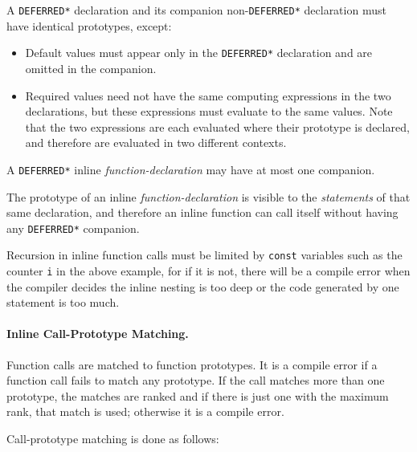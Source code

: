 \documentclass[12pt]{article}
\newcommand{\subsubsubsection}[1]{\paragraph[#1]{#1.}}
\begin{document}
A {\tt *DEFERRED*} declaration and its companion non-{\tt *DEFERRED*}
declaration must have identical prototypes, except:
\label{COMPANION-DECLARATION}
\begin{itemize}
\item Default values must appear only in the {\tt *DEFERRED*} declaration
and are omitted in the companion.
\item Required values need not have the same computing expressions
in the two declarations, but these expressions must evaluate to the
same values.  Note that the two expressions are each evaluated where
their prototype is declared, and therefore are evaluated in
two different contexts.
\end{itemize}

A {\tt *DEFERRED*} inline {\em function-declaration} may have at
most one companion.

The prototype of an inline {\em function-declaration} is visible
to the {\em statements} of that same declaration, and therefore
an inline function can call itself without having any {\tt *DEFERRED*}
companion.

Recursion in inline function calls must be limited by {\tt const}
variables such as the counter {\tt i} in the above example,
for if it is not, there
will be a compile error when the compiler decides the inline nesting
is too deep or the code generated by one statement is too much.

\subsubsubsection{Inline Call-Prototype Matching}
\label{INLINE-CALL-PROTOTYPE-MATCHING}

Function calls are matched to function prototypes.  It is
a compile error if a function call fails to match any
prototype.  If the call matches more than one prototype, the
matches are ranked and if there is just one with the maximum
rank, that match is used; otherwise it is a compile error.

Call-prototype matching is done as follows:
\end{document}
